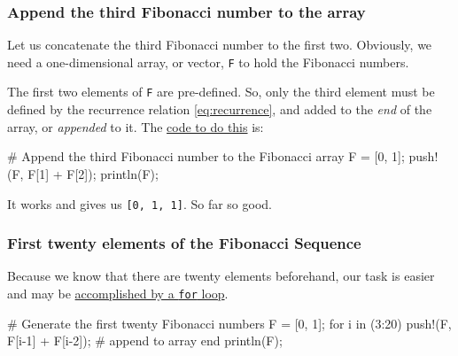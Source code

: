 \documentclass[
  a4paper,
]{article}
\newenvironment{Shaded}{\begin{snugshade}}{\end{snugshade}}
\newcommand{\CommentTok}[1]{\textcolor[rgb]{0.50,0.62,0.50}{#1}}
\newcommand{\ControlFlowTok}[1]{\textcolor[rgb]{0.94,0.87,0.69}{#1}}
\newcommand{\FloatTok}[1]{\textcolor[rgb]{0.75,0.75,0.82}{#1}}
\newcommand{\FunctionTok}[1]{\textcolor[rgb]{0.94,0.94,0.56}{#1}}
\newcommand{\KeywordTok}[1]{\textcolor[rgb]{0.94,0.87,0.69}{#1}}
\newcommand{\NormalTok}[1]{\textcolor[rgb]{0.80,0.80,0.80}{#1}}
\newcommand{\OperatorTok}[1]{\textcolor[rgb]{0.94,0.94,0.82}{#1}}
\begin{document}
\hypertarget{append-the-third-fibonacci-number-to-the-array}{%
\subsubsection{Append the third Fibonacci number to the
array}\label{append-the-third-fibonacci-number-to-the-array}}

Let us concatenate the third Fibonacci number to the first two.
Obviously, we need a one-dimensional array, or vector, \texttt{F} to
hold the Fibonacci numbers.

The first two elements of \texttt{F} are pre-defined. So, only the third
element must be defined by the recurrence relation \cref{eq:recurrence},
and added to the \emph{end} of the array, or \emph{appended} to it. The
\href{auxiliary/first-three.jl}{code to do this} is:

\begin{Shaded}
\begin{Highlighting}[]
\CommentTok{\# Append the third Fibonacci number to the Fibonacci array}
\NormalTok{F }\OperatorTok{=}\NormalTok{ [}\FloatTok{0}\NormalTok{, }\FloatTok{1}\NormalTok{];}
\FunctionTok{push!}\NormalTok{(F, F[}\FloatTok{1}\NormalTok{] }\OperatorTok{+}\NormalTok{ F[}\FloatTok{2}\NormalTok{]);}
\FunctionTok{println}\NormalTok{(F);}
\end{Highlighting}
\end{Shaded}

It works and gives us \texttt{{[}0,\ 1,\ 1{]}}. So far so good.

\hypertarget{first-twenty-elements-of-the-fibonacci-sequence}{%
\subsubsection{First twenty elements of the Fibonacci
Sequence}\label{first-twenty-elements-of-the-fibonacci-sequence}}

Because we know that there are twenty elements beforehand, our task is
easier and may be \href{auxiliary/first-twenty.jl}{accomplished by a
\texttt{for} loop}.

\begin{Shaded}
\begin{Highlighting}[]
\CommentTok{\# Generate the first twenty Fibonacci numbers}
\NormalTok{F }\OperatorTok{=}\NormalTok{ [}\FloatTok{0}\NormalTok{, }\FloatTok{1}\NormalTok{];}
\ControlFlowTok{for}\NormalTok{ i }\KeywordTok{in}\NormalTok{ (}\FloatTok{3}\OperatorTok{:}\FloatTok{20}\NormalTok{)}
  \FunctionTok{push!}\NormalTok{(F, F[i}\OperatorTok{{-}}\FloatTok{1}\NormalTok{] }\OperatorTok{+}\NormalTok{ F[i}\OperatorTok{{-}}\FloatTok{2}\NormalTok{]); }\CommentTok{\# append to array}
\ControlFlowTok{end}
\FunctionTok{println}\NormalTok{(F);}
\end{Highlighting}
\end{Shaded}
\end{document}
